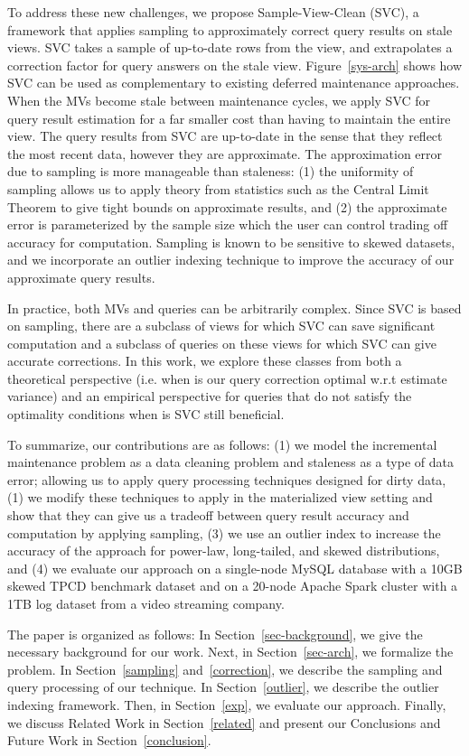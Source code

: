 To address these new challenges, we propose Sample-View-Clean (SVC), a framework that applies sampling to approximately correct query results on stale views.
SVC takes a sample of up-to-date rows from the view, and extrapolates a correction factor for query answers on the stale view. Figure~\ref{sys-arch} shows how SVC can be used as complementary to existing deferred maintenance approaches. When the MVs become stale between maintenance cycles, we apply SVC for query result estimation for a far smaller cost than having to maintain the entire view.
The query results from SVC are up-to-date in the sense that they reflect the most recent data, however they are approximate. 
The approximation error due to sampling is more manageable than staleness: (1) the uniformity of sampling allows us to apply theory from statistics such as the Central Limit Theorem to give tight bounds on approximate results, and (2) the approximate error is parameterized by the sample size which the user can control trading off accuracy for computation.
Sampling is known to be sensitive to skewed datasets, and we incorporate an outlier indexing technique to improve the accuracy of our approximate query results.

In practice, both MVs and queries can be arbitrarily complex.
Since SVC is based on sampling, there are a subclass of views for which SVC can save significant computation and a subclass of queries on these views for which SVC can give accurate corrections.
In this work, we explore these classes from both a theoretical perspective (i.e. when is our query correction optimal w.r.t estimate variance) and an empirical perspective for queries that do not satisfy the optimality conditions when is SVC still beneficial.

To summarize, our contributions are as follows: (1) we model the incremental maintenance problem as a data cleaning problem and staleness as a type of data error; allowing us to apply query processing techniques designed for dirty data, (1) we modify these techniques to apply in the materialized view setting and show that they can give us a tradeoff between query result accuracy and computation by applying sampling, (3) we use an outlier index to increase the accuracy of the approach for power-law, long-tailed, and skewed distributions, and (4) we evaluate our approach on a single-node MySQL database with a 10GB skewed TPCD benchmark dataset and on a 20-node Apache Spark cluster with a 1TB log dataset from a video streaming company. 

The paper is organized as follows: 
In Section~\ref{sec-background}, we give the necessary background for our work.
Next, in Section~\ref{sec-arch}, we formalize the problem.
In Section~\ref{sampling} and~\ref{correction}, we describe the sampling and query processing of our technique.
In Section~\ref{outlier}, we describe the outlier indexing framework.
Then, in Section~\ref{exp}, we evaluate our approach.
Finally, we discuss Related Work in Section~\ref{related} and present our Conclusions and Future Work in Section~\ref{conclusion}.
